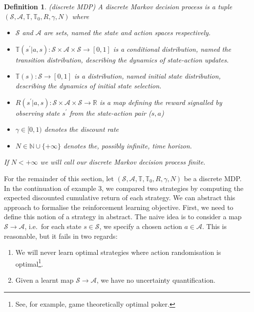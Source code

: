 \documentclass[12pt]{article}
\newtheorem{definition}{Definition}
\begin{document}
\begin{definition}{(discrete MDP)}
    A discrete Markov decision process is a tuple $(\mathcal{S}, \mathcal{A}, \mathbb{T}, \mathbb{T}_0, R, \gamma, N)$ where

    \begin{itemize}
        \item $\mathcal{S}$ and $\mathcal{A}$ are sets, named the state and action spaces respectively. 
        \item $\mathbb{T}(s^\prime | a, s): \mathcal{S} \times \mathcal{A} \times \mathcal{S} \to [0,1]$ is a conditional distribution, 
        named the transition distribution, describing the dynamics of state-action updates. 
        \item $\mathbb{T}(s): \mathcal{S} \to [0,1]$ is a distribution, named initial state distribution, describing the 
        dynamics of initial state selection. 
        \item  $R(s^\prime | a, s): \mathcal{S} \times \mathcal{A} \times \mathcal{S} \to \mathbb{R}$ is a map defining 
        the reward signalled by observing state $s^\prime$ from the state-action pair ($s, a$)
        \item $\gamma \in [0,1)$ denotes the discount rate
        \item $N \in \mathbb{N} \cup \{+\infty\}$ denotes the, possibly infinite, time horizon. 
    \end{itemize}

    If $N < +\infty$ we will call our discrete Markov decision process finite.
\end{definition}

For the remainder of this section, let $(\mathcal{S}, \mathcal{A}, \mathbb{T}, \mathbb{T}_0, R, \gamma, N)$ be a discrete MDP. \\ 

In the continuation of example 3, we compared two strategies by computing the expected discounted cumulative return of each 
strategy. We can abstract this approach to formalise the reinforcement learning objective. First, we need to define this 
notion of a strategy in abstract. The naive idea is to consider a map $\mathcal{S} \to \mathcal{A}$, i.e.~for each state $s \in \mathcal{S}$, we specify a 
chosen action $a \in \mathcal{A}$. This is reasonable, but it fails in two regards:  

\begin{enumerate}
    \item We will never learn optimal strategies where action randomisation is optimal\footnote{
        See, for example, game theoretically optimal poker. 
    }. 
    \item Given a learnt map $\mathcal{S} \to \mathcal{A}$, we have no uncertainty quantification. 
\end{enumerate}
\end{document}
